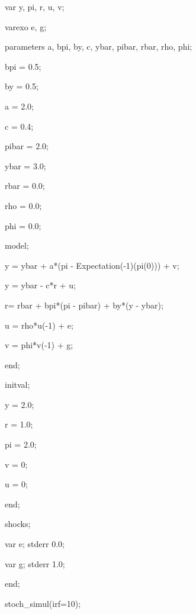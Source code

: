 ﻿\documentclass[oneside]{book}
\begin{document}
var y, pi, r, u, v;

varexo e, g;

parameters a, bpi, by, c, ybar, pibar, rbar, rho, phi;

bpi = 0.5;

by = 0.5;

a = 2.0;

c = 0.4;

pibar = 2.0;

ybar = 3.0;

rbar = 0.0;

rho = 0.0;

phi = 0.0;

model;

y = ybar + a*(pi - Expectation(-1)(pi(0))) + v;

y = ybar - c*r + u;

r= rbar + bpi*(pi - pibar) + by*(y - ybar);

u = rho*u(-1) + e;

v = phi*v(-1) + g;

end;

initval;

y = 2.0;

r = 1.0;

pi = 2.0;

v = 0;

u = 0;

end;

shocks;

var e; stderr 0.0;

var g; stderr 1.0;

end;

stoch\_simul(irf=10);
\end{document}
